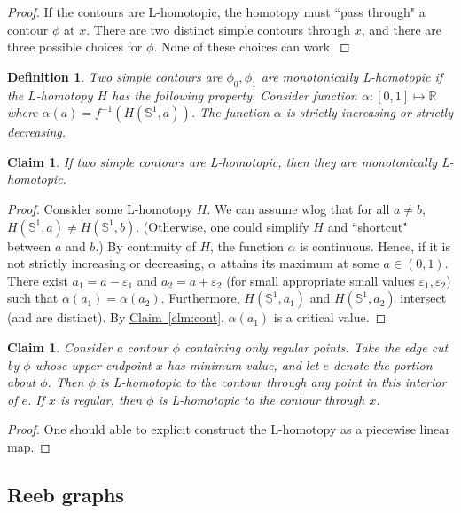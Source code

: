 \documentclass[11pt]{article}
\newtheorem{claim}[theorem]{Claim}
\newtheorem{definition}[theorem]{Definition}
\theoremstyle{definition}
\newcommand{\RR}{\mathbb{R}}
\newcommand{\SSS}{\mathbb{S}}
\newcommand{\eps}{\varepsilon}
\newcommand{\Clm}[1]{\hyperref[clm:#1]{Claim~\ref*{clm:#1}}} %
\begin{document}
\begin{proof} If the contours are L-homotopic, the homotopy must ``pass through" a contour $\phi$ at $x$.
There are two distinct simple contours through $x$, and there are three possible choices for $\phi$. None of these
choices can work.
\end{proof}

\begin{definition} \label{def:hom-mono} Two simple contours are $\phi_0, \phi_1$ are \emph{monotonically L-homotopic}
if the $L$-homotopy $H$ has the following property. Consider function $\alpha:[0,1] \mapsto \RR$
where $\alpha(a) = f^{-1}(H(\SSS^1,a))$. The function $\alpha$ is strictly increasing or strictly decreasing.
\end{definition}

\begin{claim} \label{clm:mono} If two simple contours are L-homotopic, then they are monotonically L-homotopic.
\end{claim}

\begin{proof} Consider some L-homotopy $H$. We can assume wlog that for all $a \neq b$, $H(\SSS^1,a) \neq H(\SSS^1,b)$.
(Otherwise, one could simplify $H$ and ``shortcut" between $a$ and $b$.)
By continuity of $H$, the function $\alpha$ is continuous. Hence, if it is not strictly
increasing or decreasing, $\alpha$ attains its maximum at some $a \in (0,1)$. There exist $a_1 = a - \eps_1$
and $a_2 = a + \eps_2$ (for small appropriate small values $\eps_1, \eps_2$) such that $\alpha(a_1) = \alpha(a_2)$.
Furthermore, $H(\SSS^1,a_1)$ and $H(\SSS^1,a_2)$ intersect (and are distinct). By \Clm{cont}, $\alpha(a_1)$
is a critical value. 
\end{proof}

\begin{claim} \label{clm:reg} Consider a contour $\phi$ containing only regular points. 
Take the edge cut by $\phi$ whose upper endpoint $x$ has minimum value, and let $e$
denote the portion about $\phi$. Then $\phi$ is L-homotopic to the contour
through any point in this interior of $e$. If $x$ is regular, then $\phi$ is L-homotopic
to the contour through $x$.
\end{claim}

\begin{proof} One should able to explicit construct the L-homotopy as a piecewise linear map.
\end{proof}

\subsection{Reeb graphs} \label{sec:reeb}
\end{document}
